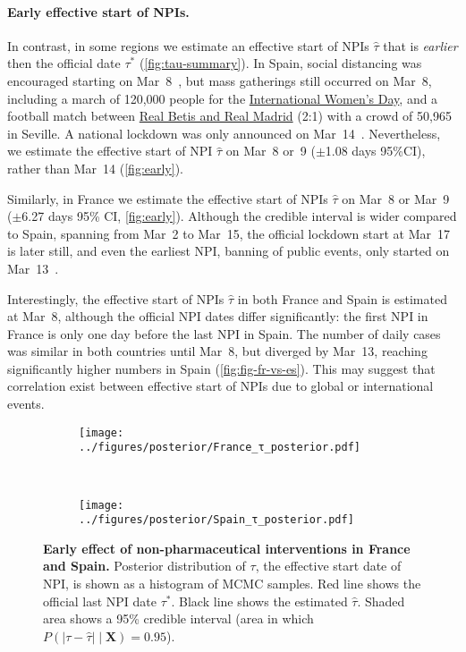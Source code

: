 \documentclass[12pt]{extarticle}
\let\vec\mathbf
\begin{document}
\paragraph*{Early effective start of NPIs.}
In contrast, in some regions we estimate an effective start of NPIs $\hat{\tau}$ that is \emph{earlier} then the official date $\tau^*$ (\autoref{fig:tau-summary}).
In Spain, social distancing was encouraged starting on Mar~8~\citep{Flaxman2020}, but mass gatherings still occurred on Mar~8, including a march of 120,000 people for the \href{https://www.nytimes.com/2020/03/13/world/europe/spain-coronavirus-emergency.html}{International Women's Day}, and a  football match between \href{https://www.espn.com/soccer/match?gameId=550350}{Real Betis and Real Madrid} (2:1) with a crowd of 50,965 in Seville.
A national lockdown was only announced on Mar~14~\citep{Flaxman2020}.
Nevertheless, we estimate the effective start of NPI $\hat{\tau}$ on Mar~8 or~9 ($\pm$1.08 days 95\%CI), rather than Mar~14 (\autoref{fig:early}).

Similarly, in France we estimate the effective start of NPIs $\hat{\tau}$ on Mar~8 or Mar~9 ($\pm$6.27 days 95\% CI, \autoref{fig:early}). Although the credible interval is wider compared to Spain, spanning from Mar~2 to Mar~15, the official lockdown start at Mar~17 is later still, and even the earliest NPI, banning of public events, only started on Mar~13~\citep{Flaxman2020}.

Interestingly, the effective start of NPIs $\hat{\tau}$ in both France and Spain is estimated at Mar~8, although the official NPI dates differ significantly: the first NPI in France is only one day before the last NPI in Spain.
The number of daily cases was similar in both countries until Mar~8, but diverged by Mar~13, reaching significantly higher numbers in Spain (\autoref{fig:fig-fr-vs-es}).
This may suggest that correlation exist between effective start of NPIs due to global or international events.



\begin{figure}[h]
    \centering
    \begin{subfigure}{0.45\textwidth}
        \texttt{[image: ../figures/posterior/France\_τ\_posterior.pdf]}
    \end{subfigure}
    ~
    \begin{subfigure}{0.45\textwidth}
        \texttt{[image: ../figures/posterior/Spain\_τ\_posterior.pdf]}
    \end{subfigure}
    \caption{
    \textbf{Early effect of non-pharmaceutical interventions in France and Spain.}
    Posterior distribution of $\tau$, the effective start date of NPI, is shown as a histogram of MCMC samples. Red line shows the official last NPI date $\tau^*$. Black line shows the estimated $\hat{\tau}$. Shaded area shows a 95\% credible interval (area in which $P(|\tau - \hat{\tau}| \mid \vec{X}) = 0.95$). 
	}
	\label{fig:early}
\end{figure}
\end{document}
